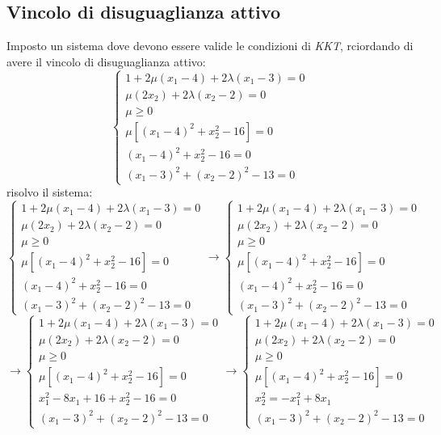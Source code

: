 \documentclass[a4paper,12pt, oneside]{book}
\begin{document}
\subsection{Vincolo di disuguaglianza attivo}
Imposto un sistema dove devono essere valide le condizioni di
\textit{KKT}, rciordando di avere il vincolo di disuguaglianza attivo:
\[
  \begin{cases}
     1+2\mu(x_1-4)+2\lambda(x_1-3)=0\\
     \mu(2x_2)+2\lambda(x_2-2)=0\\
     \mu\geq 0\\
     \mu[(x_1-4)^2+x_2^2-16]=0\\
     (x_1-4)^2+x_2^2-16 = 0\\
     (x_1-3)^2+(x_2-2)^2-13=0
  \end{cases}
\]
risolvo il sistema:
\[
  \begin{cases}
    1+2\mu(x_1-4)+2\lambda(x_1-3)=0\\
    \mu(2x_2)+2\lambda(x_2-2)=0\\
    \mu\geq 0\\
    \mu[(x_1-4)^2+x_2^2-16]=0\\
    (x_1-4)^2+x_2^2-16 = 0\\
    (x_1-3)^2+(x_2-2)^2-13=0
  \end{cases}\to
  \begin{cases}
    1+2\mu(x_1-4)+2\lambda(x_1-3)=0\\
    \mu(2x_2)+2\lambda(x_2-2)=0\\
    \mu\geq 0\\
    \mu[(x_1-4)^2+x_2^2-16]=0\\
    (x_1-4)^2+x_2^2-16 = 0\\
    (x_1-3)^2+(x_2-2)^2-13=0
  \end{cases}
\]
\[\to
  \begin{cases}
    1+2\mu(x_1-4)+2\lambda(x_1-3)=0\\
    \mu(2x_2)+2\lambda(x_2-2)=0\\
    \mu\geq 0\\
    \mu[(x_1-4)^2+x_2^2-16]=0\\
    x_1^2-8x_1+16+x_2^2-16 = 0\\
    (x_1-3)^2+(x_2-2)^2-13=0
  \end{cases}\to
  \begin{cases}
    1+2\mu(x_1-4)+2\lambda(x_1-3)=0\\
    \mu(2x_2)+2\lambda(x_2-2)=0\\
    \mu\geq 0\\
    \mu[(x_1-4)^2+x_2^2-16]=0\\
    x_2^2=-x_1^2+8x_1 \\
    (x_1-3)^2+(x_2-2)^2-13=0
  \end{cases}
\]
\end{document}
